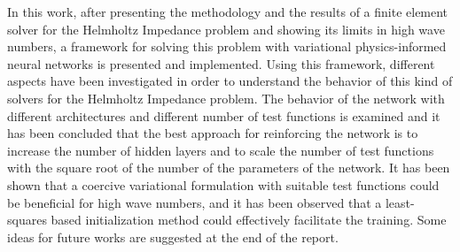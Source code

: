 In this work, after presenting the methodology and the results of a finite element solver for the Helmholtz Impedance problem and showing its limits in high wave numbers, a framework for solving this problem with variational physics-informed neural networks is presented and implemented. Using this framework, different aspects have been investigated in order to understand the behavior of this kind of solvers for the Helmholtz Impedance problem. The behavior of the network with different architectures and different number of test functions is examined and it has been concluded that the best approach for reinforcing the network is to increase the number of hidden layers and to scale the number of test functions with the square root of the number of the parameters of the network. It has been shown that a coercive variational formulation with suitable test functions could be beneficial for high wave numbers, and it has been observed that a least-squares based initialization method could effectively facilitate the training. Some ideas for future works are suggested at the end of the report.
